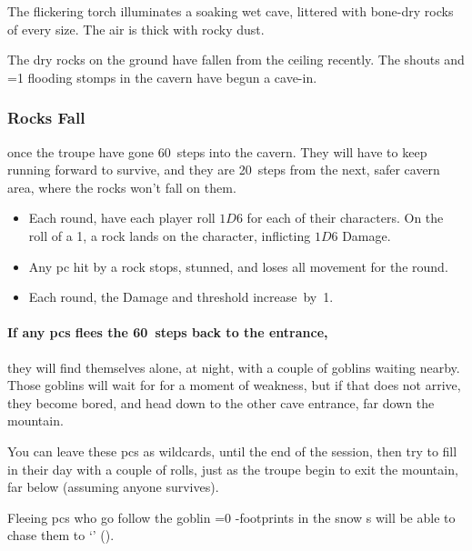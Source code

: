 \begin{multicols}{2}
\begin{boxtext}
  The flickering torch illuminates a soaking wet cave, littered with bone-dry rocks of every size.
  The air is thick with rocky dust.
\end{boxtext}

The dry rocks on the ground have fallen from the ceiling recently.
The shouts and \ifnum\value{temperature}=1 flooding \else stomps \fi in the cavern have begun a cave-in.

\playCommentaryAftermath

\subsubsection{Rocks Fall}
once the troupe have gone 60~\glspl{step} into the cavern.
They will have to keep running forward to survive, and they are 20~\glspl{step} from the next, safer cavern \gls{area}, where the rocks won't fall on them.
\label{caveIn}

\begin{itemize}
  \item
  Each \gls{round}, have each player roll $1D6$ for each of their characters.
  On the roll of a 1, a rock lands on the character, inflicting $1D6$ Damage.
  \item
  Any \gls{pc} hit by a rock stops, stunned, and loses all movement for the \gls{round}.
  \item
  Each \gls{round}, the Damage and threshold increase~by~1.
\end{itemize}

\caveIn

\paragraph{If any \glspl{pc} flees the 60~\glspl{step} back to the entrance,}
they will find themselves alone, at night, with a couple of goblins waiting nearby.
Those goblins will wait for  for a moment of weakness, but if that does not arrive, they become bored, and head down to the other cave entrance, far down the mountain.

\label{pcRunaways}
You can leave these \glspl{pc} as wildcards, until the end of the session, then try to fill in their day with a couple of rolls, just as the troupe begin to exit the mountain, far below (assuming anyone survives).

Fleeing \glspl{pc} who go follow the goblin%
\ifnum\value{temperature}=0%
 -footprints in the snow
\else%
  s
\fi%
will be able to chase them to `' ().


\end{multicols}
